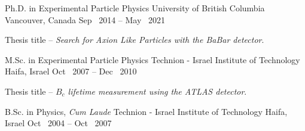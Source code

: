 
\begin{cventries}

  \cventry
    {Ph.D. in Experimental Particle Physics} %
    {University of British Columbia} %
    {Vancouver, Canada} %
    {Sep \ 2014 -- May \ 2021} %
    {
      \begin{cvitems} %
        \item {Thesis title -- \emph{Search for Axion Like Particles with the BaBar detector}.}
      \end{cvitems}
    }

    \cventry
    {M.Sc. in Experimental Particle Physics} %
    {Technion - Israel Institute of Technology} %
    {Haifa, Israel} %
    {Oct \ 2007 -- Dec \ 2010} %
    {
      \begin{cvitems} %
        \item {Thesis title -- \emph{$B_c$ lifetime measurement using the ATLAS detector}.}
      \end{cvitems}
    }

  \cventry
    {B.Sc. in Physics, \emph{Cum Laude}} %
    {Technion - Israel Institute of Technology} %
    {Haifa, Israel} %
    {Oct \ 2004 -- Oct \ 2007} %
    {}
    \vspace{-4mm}
\end{cventries}
